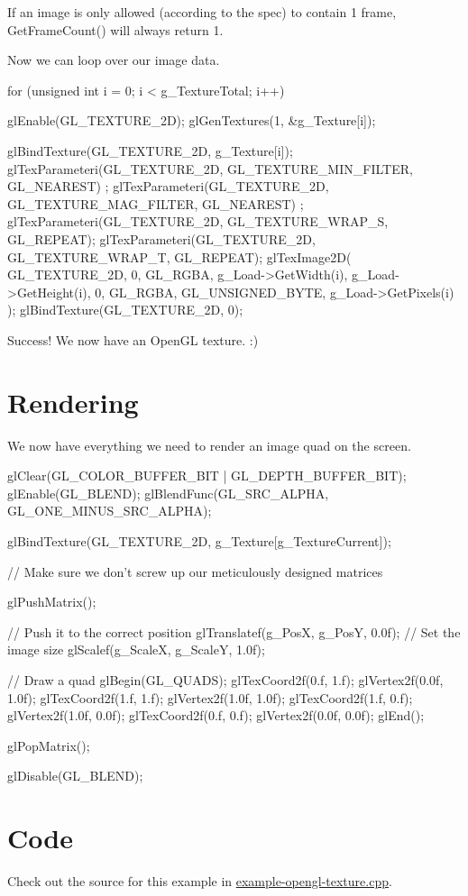 If an image is only allowed (according to the spec) to contain 1 frame, GetFrameCount() will always return 1.

Now we can loop over our image data.


\begin{DoxyCode}
        for (unsigned int i = 0; i < g_TextureTotal; i++)
        {
                glEnable(GL_TEXTURE_2D);
                glGenTextures(1, &g_Texture[i]);

                glBindTexture(GL_TEXTURE_2D, g_Texture[i]);
                glTexParameteri(GL_TEXTURE_2D, GL_TEXTURE_MIN_FILTER, GL_NEAREST)
      ;
                glTexParameteri(GL_TEXTURE_2D, GL_TEXTURE_MAG_FILTER, GL_NEAREST)
      ;
                glTexParameteri(GL_TEXTURE_2D, GL_TEXTURE_WRAP_S, GL_REPEAT);
                glTexParameteri(GL_TEXTURE_2D, GL_TEXTURE_WRAP_T, GL_REPEAT);
                glTexImage2D(
                        GL_TEXTURE_2D, 0, GL_RGBA,
                        g_Load->GetWidth(i), g_Load->GetHeight(i),
                        0,
                        GL_RGBA, GL_UNSIGNED_BYTE, g_Load->GetPixels(i)
                );
                glBindTexture(GL_TEXTURE_2D, 0);
        }
\end{DoxyCode}


Success! We now have an OpenGL texture. :)\hypertarget{example1_render}{}\section{Rendering}\label{example1_render}
We now have everything we need to render an image quad on the screen.


\begin{DoxyCode}
        glClear(GL_COLOR_BUFFER_BIT | GL_DEPTH_BUFFER_BIT);
        glEnable(GL_BLEND);
        glBlendFunc(GL_SRC_ALPHA, GL_ONE_MINUS_SRC_ALPHA);

        glBindTexture(GL_TEXTURE_2D, g_Texture[g_TextureCurrent]);

        // Make sure we don't screw up our meticulously designed matrices

        glPushMatrix();

                // Push it to the correct position
                glTranslatef(g_PosX, g_PosY, 0.0f);
                // Set the image size
                glScalef(g_ScaleX, g_ScaleY, 1.0f);

                // Draw a quad
                glBegin(GL_QUADS);
                        glTexCoord2f(0.f, 1.f); glVertex2f(0.0f, 1.0f);
                        glTexCoord2f(1.f, 1.f); glVertex2f(1.0f, 1.0f);
                        glTexCoord2f(1.f, 0.f); glVertex2f(1.0f, 0.0f);
                        glTexCoord2f(0.f, 0.f); glVertex2f(0.0f, 0.0f);
                glEnd();

        glPopMatrix();

        glDisable(GL_BLEND);
\end{DoxyCode}
\hypertarget{example1_code}{}\section{Code}\label{example1_code}
Check out the source for this example in \hyperlink{example-opengl-texture_8cpp}{example-\/opengl-\/texture.cpp}. 
